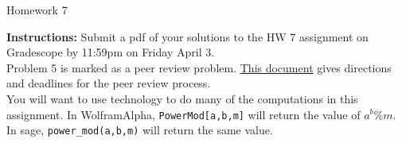 \documentclass[12pt]{article}
\begin{document}
\begin{center}
{\Large Homework 7}\\


\end{center}
{\bf Instructions:} Submit a pdf of your solutions to the HW 7 assignment on Gradescope by 11:59pm on Friday April 3. \\[3pt]

\noindent Problem 5 is marked as a peer review problem. \href{https://docs.google.com/document/d/1jSw9pmMJJFUx_6dTkcUi4k4HJNIrrIIgs9zdWhAycx0/edit?usp=drive_link}{This document} gives directions and deadlines for the peer review process.
\\[3pt]

 You will want to use technology to do many of the computations in this assignment. In WolframAlpha, \verb|PowerMod[a,b,m]| will return the value of $a^b\% m$. In sage, \verb|power_mod(a,b,m)| will return the same value. \\
\end{document}
